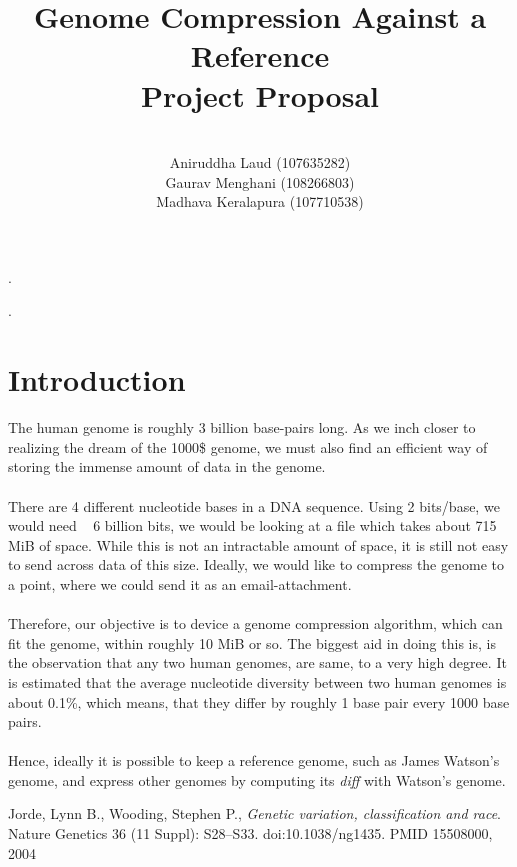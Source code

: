 \documentclass{article}
\title{Genome Compression Against a Reference \\
        Project Proposal \\}
\author{\\
        Aniruddha Laud (107635282)\\
        Gaurav Menghani (108266803)\\
        Madhava Keralapura (107710538)\\}
\begin{document}
\maketitle

\clearpage
.
\clearpage

\tableofcontents

\clearpage
.
\clearpage

\section {Introduction}
The human genome is roughly 3 billion base-pairs long. As we inch closer to realizing the dream of the 1000\$ genome, we must also find an efficient way of storing the immense amount of data in the genome.\\
\\
There are 4 different nucleotide bases in a DNA sequence. Using 2 bits/base, we would need ~ 6 billion bits, we would be looking at a file which takes about 715 MiB of space. While this is not an intractable amount of space, it is still not easy to send across data of this size. Ideally, we would like to compress the genome to a point, where we could send it as an email-attachment.\\
\\
Therefore, our objective is to device a genome compression algorithm, which can fit the genome, within roughly 10 MiB or so. The biggest aid in doing this is, is the observation that any two human genomes, are same, to a very high degree. It is estimated that the average nucleotide diversity between two human genomes is about 0.1\%, which means, that they differ by roughly 1 base pair every 1000 base pairs.\cite{jorde04}\\
\\
Hence, ideally it is possible to keep a reference genome, such as James Watson's genome, and express other genomes by computing its \emph{diff} with Watson's genome. 

\clearpage

\begin{thebibliography}{9}

  Jorde, Lynn B., Wooding, Stephen P.,
  \emph{Genetic variation, classification and race}.
  Nature Genetics 36 (11 Suppl): S28–S33. doi:10.1038/ng1435. PMID 15508000,
  2004

\end{thebibliography}
\end{document}
